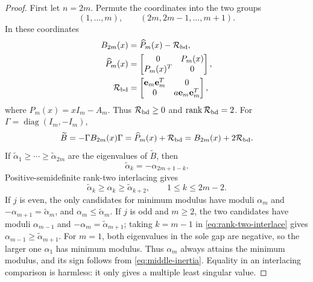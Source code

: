 \documentclass[review,hidelinks,onefignum,onetabnum]{siamart251216}
\DeclareMathOperator{\diag}{diag}
\begin{document}
\begin{proof}
First let \(n=2m\).  Permute the coordinates into the two groups
\[
 (1,\ldots,m),\qquad(2m,2m-1,\ldots,m+1).
\]
In these coordinates
\begin{equation}\label{eq:even-dilation}
\begin{aligned}
 B_{2m}(x)&=\widehat P_m(x)-\mathcal R_{\rm bd},\\
 \widehat P_m(x)&=\begin{bmatrix}0&P_m(x)\\P_m(x)^T&0\end{bmatrix},\\
 \mathcal R_{\rm bd}
 &=\begin{bmatrix}\mathbf e_m\mathbf e_m^T&0\\
 0&a \mathbf e_m\mathbf e_m^T\end{bmatrix},
\end{aligned}
\end{equation}
where \(P_m(x)=xI_m-A_m\).  Thus \(\mathcal R_{\rm bd}\geq0\) and
\(\operatorname{rank}\mathcal R_{\rm bd}=2\).  For
\(\Gamma=\diag(I_m,-I_m)\),
\[
 \widetilde B=-\Gamma B_{2m}(x)\Gamma
 =\widehat P_m(x)+\mathcal R_{\rm bd}
 =B_{2m}(x)+2\mathcal R_{\rm bd}.
\]
If \(\widetilde\alpha_1\geq\cdots\geq\widetilde\alpha_{2m}\) are the
eigenvalues of
\(\widetilde B\), then
\begin{equation}\label{eq:alpha-reflection}
 \widetilde\alpha_k=-\alpha_{2m+1-k}.
\end{equation}
Positive-semidefinite rank-two interlacing gives
\begin{equation}\label{eq:rank-two-interlace}
 \widetilde\alpha_k\geq\alpha_k\geq\widetilde\alpha_{k+2},
 \qquad1\leq k\leq2m-2.
\end{equation}
If \(j\) is even, the only candidates for minimum modulus
have moduli \(\alpha_m\) and
\(-\alpha_{m+1}=\widetilde\alpha_m\), and
\(\alpha_m\leq\widetilde\alpha_m\).  If \(j\) is odd and \(m\geq2\), the two
candidates have moduli \(\alpha_{m-1}\) and
\(-\alpha_m=\widetilde\alpha_{m+1}\); taking \(k=m-1\) in
\eqref{eq:rank-two-interlace} gives
\(\alpha_{m-1}\geq\widetilde\alpha_{m+1}\).  For \(m=1\), both eigenvalues in
the sole gap are negative, so the larger one \(\alpha_1\) has minimum
modulus.  Thus \(\alpha_m\) always attains the minimum modulus, and its
sign follows from \eqref{eq:middle-inertia}.  Equality in an interlacing
comparison is harmless: it only gives a multiple least singular value.


\end{proof}
\end{document}

